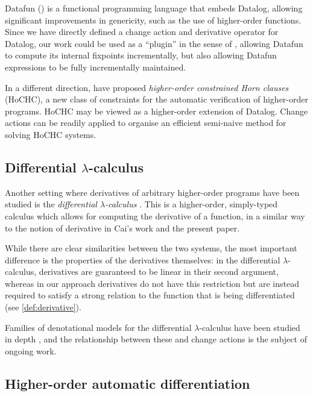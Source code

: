 Datafun (\textcite{arntz2016datafun}) is a functional programming language that embeds
Datalog, allowing significant improvements in genericity, such as the use of
higher-order functions. Since we have directly defined a change action and
derivative operator for Datalog, our work could be used as a ``plugin'' in the sense
of \citeauthor{cai2014changes}, allowing Datafun to compute its internal fixpoints
incrementally, but also allowing Datafun expressions to be fully incrementally maintained.

In a different direction, \textcite{cathcartburn2018hochc} have proposed
\emph{higher-order constrained Horn clauses}
(HoCHC), a new class of constraints for the automatic verification of higher-order programs.
HoCHC may be viewed as a higher-order extension of Datalog. 
Change actions can be readily applied to organise an efficient semi-naive method for solving HoCHC systems.

\subsection{Differential $\lambda$-calculus}

Another setting where derivatives of arbitrary higher-order programs have been studied
is the \emph{differential $\lambda$-calculus} \autocites{ehrhard2003differential}{ehrhard2017introduction}.
This is a higher-order, simply-typed
calculus which allows for computing the derivative of a function, in a similar
way to the notion of derivative in Cai's work and the present paper.

While there are clear similarities between the two systems, 
the most important difference is the properties of the derivatives themselves:
in the differential $\lambda$-calculus, derivatives are guaranteed to be linear
in their second argument, whereas in our approach derivatives do not have this restriction 
but are instead required to satisfy a strong relation to the function
that is being differentiated (see \cref{def:derivative}).

Families of denotational models for the differential $\lambda$-calculus have been
studied in depth
\autocites{bucciarelli2010categorical}{blute2010convenient}{cockett2016categorical}{kerjean2016mackey},
and the relationship between these and change actions is the subject of ongoing work.

\subsection{Higher-order automatic differentiation}

